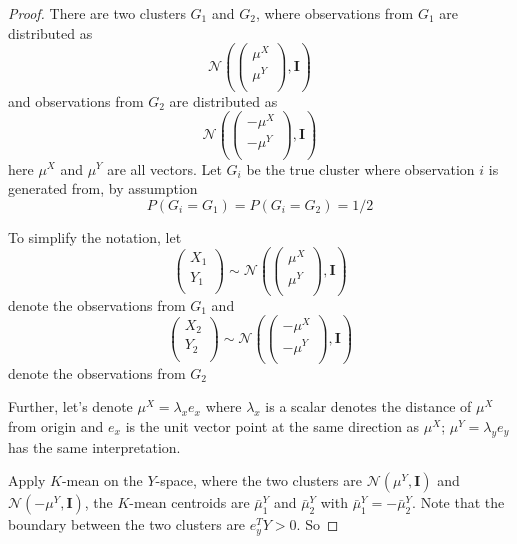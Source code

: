\documentclass[12pt]{article}
\begin{document}
\begin{proof}
There are two clusters $G_1$ and $G_2$, where observations from $G_1$ are distributed as
\[	\mathcal{N}\left( \begin{pmatrix} 
    \mu^X \\
    \mu^Y \\
  \end{pmatrix}, \mathbf{I} \right)	\]
and observations from $G_2$ are distributed as
\[	\mathcal{N}\left( \begin{pmatrix} 
    -\mu^X \\
    -\mu^Y \\
  \end{pmatrix}, \mathbf{I} \right)	\]
here $\mu^X$ and $\mu^Y$ are all vectors. Let $G_i$ be the true cluster where observation $i$ is generated from, by assumption
\[	P(G_i=G_1) = P(G_i=G_2) = 1/2	\]

To simplify the notation, let 
\[
 \begin{pmatrix} 
    X_1 \\
    Y_1 \\
  \end{pmatrix}  \sim
  \mathcal{N}\left( \begin{pmatrix} 
    \mu^X \\
    \mu^Y \\
  \end{pmatrix}, \mathbf{I} \right)
\]  
denote the observations from $G_1$ and 
\[
 \begin{pmatrix} 
    X_2 \\
    Y_2 \\
  \end{pmatrix}  \sim
  \mathcal{N}\left( \begin{pmatrix} 
    -\mu^X \\
    -\mu^Y \\
  \end{pmatrix}, \mathbf{I} \right)
\]  
denote the observations from $G_2$ 

Further, let's denote $\mu^X = \lambda_x e_x$ where $\lambda_x$ is a scalar denotes the distance of $\mu^X$ from origin and $e_x$ is the unit vector point at the same direction as $\mu^X$; $\mu^Y = \lambda_y e_y$ has the same interpretation.

Apply $K$-mean on the $Y$-space, where the two clusters are $\mathcal{N}\left( \mu^Y, \mathbf{I}\right)$ and  $\mathcal{N}\left( -\mu^Y, \mathbf{I}\right)$, the $K$-mean centroids are $\bar{\mu}^Y_1$ and $\bar{\mu}^Y_2$ with $\bar{\mu}^Y_1 = -\bar{\mu}^Y_2$. Note that the boundary between the two clusters are $e^T_y Y > 0 $. So 


\end{proof}
\end{document}
